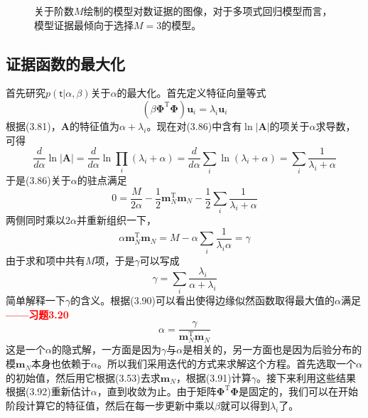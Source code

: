 \documentclass[b5paper]{book}
\numberwithin{equation}{chapter}
\newcommand {\sft} {\boldsymbol{\mathsf{t}}}
\newcommand {\rmT} {\mathrm{T}}
\newcommand {\bfPhi} {\boldsymbol{\Phi}}
\begin{document}
{\begin{figure}[ht]
		\caption{关于阶数$M$绘制的模型对数证据的图像，对于多项式回归模型而言，模型证据最倾向于选择$M=3$的模型。}
		\label{fig:3-14}
	\end{figure}
	}
	\subsection{证据函数的最大化}
	\textnormal{
	首先研究$p(\sft|\alpha,\beta)$关于$\alpha$的最大化。首先定义特征向量等式
	\begin{equation}
		(\beta \bfPhi^{\rmT}\bfPhi)\mathbf{u}_i = \lambda_i \mathbf{u}_i
	\end{equation}
	根据(3.81)，$\mathbf{A}$的特征值为$\alpha + \lambda_i$。现在对(3.86)中含有$\ln |\mathbf{A}|$的项关于$\alpha$求导数，可得
	\begin{equation}
		\frac{d}{d\alpha}\ln |\mathbf{A}| = \frac{d}{d\alpha}\ln \prod_{i}(\lambda_i + \alpha) = \frac{d}{d\alpha}\sum_{i} \ln (\lambda_i+\alpha)=\sum_{i}\frac{1}{\lambda_i+\alpha}
	\end{equation}
	于是(3.86)关于$\alpha$的驻点满足
	\begin{equation}
		0 = \frac{M}{2\alpha} - \frac{1}{2}\mathbf{m}_N^{\rmT}\mathbf{m}_N - \frac{1}{2}\sum_{i}\frac{1}{\lambda_i + \alpha}
	\end{equation}
	两侧同时乘以$2\alpha$并重新组织一下，
	\begin{equation}
		\alpha \mathbf{m}_N^{\rmT} \mathbf{m}_N = M - \alpha \sum_{i}\frac{1}{\lambda_i \alpha} = \gamma
	\end{equation}
	由于求和项中共有$M$项，于是$\gamma$可以写成
	\begin{equation}
		\gamma = \sum_{i}\frac{\lambda_i}{\alpha + \lambda_i}
	\end{equation}
	简单解释一下$\gamma$的含义。根据(3.90)可以看出使得边缘似然函数取得最大值的$\alpha$满足\textcolor{red}{\textbf{——习题3.20}}
	\begin{equation}
		\alpha = \frac{\gamma}{\mathbf{m}_N^{\rmT}\mathbf{m}_N}
	\end{equation}
	这是一个$\alpha$的隐式解，一方面是因为$\gamma$与$\alpha$是相关的，另一方面也是因为后验分布的模$\mathbf{m}_N$本身也依赖于$\alpha$。所以我们采用迭代的方式来求解这个方程。首先选取一个$\alpha$的初始值，然后用它根据(3.53)去求$\mathbf{m}_N$，根据(3.91)计算$\gamma$。接下来利用这些结果根据(3.92)重新估计$\alpha$，直到收敛为止。由于矩阵$\bfPhi^{\rmT}\bfPhi$是固定的，我们可以在开始阶段计算它的特征值，然后在每一步更新中乘以$\beta$就可以得到$\lambda_i$了。\\
}
\end{document}
